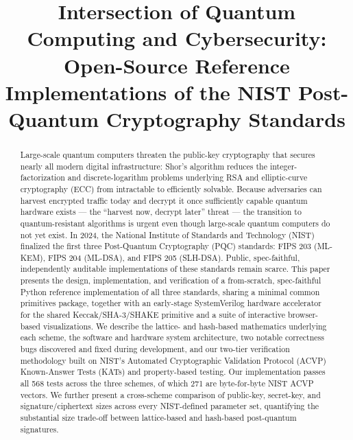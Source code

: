 \documentclass[10pt,conference]{IEEEtran}
\begin{document}
\title{Intersection of Quantum Computing and Cybersecurity: Open-Source
Reference Implementations of the NIST Post-Quantum Cryptography Standards}

\author{
}

\maketitle

\begin{abstract}
Large-scale quantum computers threaten the public-key cryptography that
secures nearly all modern digital infrastructure: Shor's algorithm reduces
the integer-factorization and discrete-logarithm problems underlying RSA
and elliptic-curve cryptography (ECC) from intractable to efficiently
solvable. Because adversaries can harvest encrypted traffic today and
decrypt it once sufficiently capable quantum hardware exists --- the
``harvest now, decrypt later'' threat --- the transition to
quantum-resistant algorithms is urgent even though large-scale quantum
computers do not yet exist. In 2024, the National Institute of Standards
and Technology (NIST) finalized the first three Post-Quantum Cryptography
(PQC) standards: FIPS 203 (ML-KEM), FIPS 204 (ML-DSA), and FIPS 205
(SLH-DSA). Public, spec-faithful, independently auditable implementations
of these standards remain scarce. This paper presents the design,
implementation, and verification of a from-scratch, spec-faithful Python
reference implementation of all three standards, sharing a minimal common
primitives package, together with an early-stage SystemVerilog hardware
accelerator for the shared Keccak/SHA-3/SHAKE primitive and a suite of
interactive browser-based visualizations. We describe the lattice- and
hash-based mathematics underlying each scheme, the software and hardware
system architecture, two notable correctness bugs discovered and fixed
during development, and our two-tier verification methodology built on
NIST's Automated Cryptographic Validation Protocol (ACVP) Known-Answer
Tests (KATs) and property-based testing. Our implementation passes all
568 tests across the three schemes, of which 271 are byte-for-byte NIST
ACVP vectors. We further present a cross-scheme comparison of public-key,
secret-key, and signature/ciphertext sizes across every NIST-defined
parameter set, quantifying the substantial size trade-off between
lattice-based and hash-based post-quantum signatures.
\end{abstract}
\end{document}
